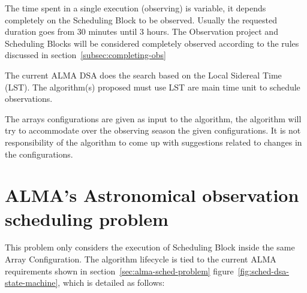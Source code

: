 The time spent in a single execution (observing) is variable, it depends completely on the Scheduling Block to be observed. Usually the requested duration goes from 30 minutes until 3 hours. The Observation project and Scheduling Blocks will be considered completely observed according to the rules discussed in section~\ref{subsec:completing-obs} 

The current ALMA DSA does the search based on the Local Sidereal Time (LST). The algorithm(s) proposed must use LST are main time unit to schedule observations.

The arrays configurations are given as input to the algorithm, the algorithm will try to accommodate over the observing season the given configurations. It is not responsibility of the algorithm to come up with suggestions related to changes in the configurations.
 
\chapter{ALMA's Astronomical observation scheduling problem}
\label{sec:astro-schedule-problem}
This problem only considers the execution of Scheduling Block inside the same Array Configuration. The algorithm lifecycle is tied to the current ALMA requirements shown in section~\ref{sec:alma-sched-problem} figure~\ref{fig:sched-dsa-state-machine}, which is detailed as follows:

